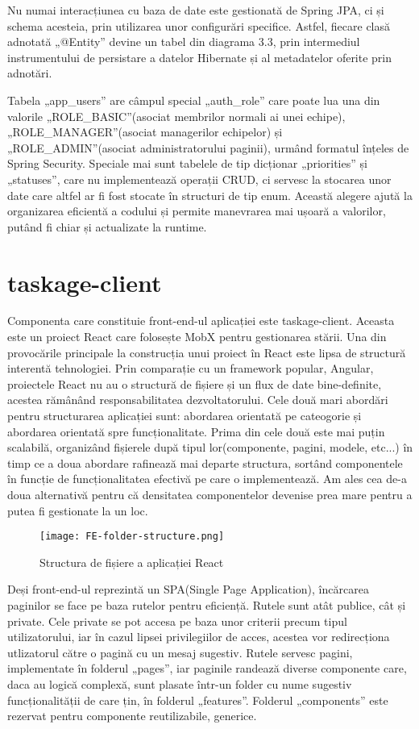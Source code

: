 Nu numai interacțiunea cu baza de date este gestionată de Spring JPA, ci și schema acesteia, prin utilizarea unor configurări specifice. Astfel, fiecare clasă adnotată „@Entity” devine un tabel din diagrama 3.3, prin intermediul instrumentului de persistare a datelor Hibernate și al metadatelor oferite prin adnotări.

Tabela „app_users” are câmpul special „auth_role” care poate lua una din valorile „ROLE_BASIC”(asociat membrilor normali ai unei echipe), „ROLE_MANAGER”(asociat managerilor echipelor) și „ROLE_ADMIN”(asociat administratorului paginii), urmând formatul înțeles de Spring Security. Speciale mai sunt tabelele de tip dicționar „priorities” și „statuses”, care nu implementează operații CRUD, ci servesc la stocarea unor date care altfel ar fi fost stocate în structuri de tip enum. Această alegere ajută la organizarea eficientă a codului și permite manevrarea mai ușoară a valorilor, putând fi chiar și actualizate la runtime.

\section{taskage-client}

Componenta care constituie front-end-ul aplicației este taskage-client. Aceasta este un proiect React care folosește MobX pentru gestionarea stării. Una din provocările principale la construcția unui proiect în React este lipsa de structură interentă tehnologiei. Prin comparație cu un framework popular, Angular, proiectele React nu au o structură de fișiere și un flux de date bine-definite, acestea rămânând responsabilitatea dezvoltatorului. Cele două mari abordări pentru structurarea aplicației sunt: abordarea orientată pe cateogorie și abordarea orientată spre funcționalitate. Prima din cele două este mai puțin scalabilă, organizând fișierele după tipul lor(componente, pagini, modele, etc...) în timp ce a doua abordare rafinează mai departe structura, sortând componentele în funcție de funcționalitatea efectivă pe care o implementează. Am ales cea de-a doua alternativă pentru că densitatea componentelor devenise prea mare pentru a putea fi gestionate la un loc.

 \begin{figure}[ht]
	\centering
 	 \texttt{[image: FE-folder-structure.png]}
	\caption{Structura de fișiere a aplicației React}
	\label{FE-folder-structure}
 \end{figure}

Deși front-end-ul reprezintă un SPA(Single Page Application), încărcarea paginilor se face pe baza rutelor pentru eficiență. Rutele sunt atât publice, cât și private. Cele private se pot accesa pe baza unor criterii precum tipul utilizatorului, iar în cazul lipsei privilegiilor de acces, acestea vor redirecționa utlizatorul către o pagină cu un mesaj sugestiv. Rutele servesc pagini, implementate în folderul „pages”, iar paginile randează diverse componente care, daca au logică complexă, sunt plasate într-un folder cu nume sugestiv funcționalității de care țin, în folderul „features”. Folderul „components” este rezervat pentru componente reutilizabile, generice.

